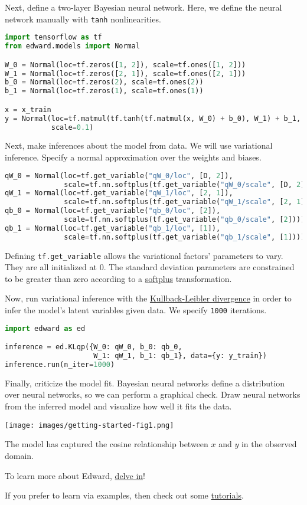 Next, define a two-layer Bayesian neural network. Here, we
define the neural network manually with \texttt{tanh} nonlinearities.

\begin{lstlisting}[language=Python]
import tensorflow as tf
from edward.models import Normal

W_0 = Normal(loc=tf.zeros([1, 2]), scale=tf.ones([1, 2]))
W_1 = Normal(loc=tf.zeros([2, 1]), scale=tf.ones([2, 1]))
b_0 = Normal(loc=tf.zeros(2), scale=tf.ones(2))
b_1 = Normal(loc=tf.zeros(1), scale=tf.ones(1))

x = x_train
y = Normal(loc=tf.matmul(tf.tanh(tf.matmul(x, W_0) + b_0), W_1) + b_1,
           scale=0.1)
\end{lstlisting}

Next, make inferences about the model from data. We will use variational
inference. Specify a normal approximation over the weights and biases.

\begin{lstlisting}[language=Python]
qW_0 = Normal(loc=tf.get_variable("qW_0/loc", [D, 2]),
              scale=tf.nn.softplus(tf.get_variable("qW_0/scale", [D, 2])))
qW_1 = Normal(loc=tf.get_variable("qW_1/loc", [2, 1]),
              scale=tf.nn.softplus(tf.get_variable("qW_1/scale", [2, 1])))
qb_0 = Normal(loc=tf.get_variable("qb_0/loc", [2]),
              scale=tf.nn.softplus(tf.get_variable("qb_0/scale", [2])))
qb_1 = Normal(loc=tf.get_variable("qb_1/loc", [1]),
              scale=tf.nn.softplus(tf.get_variable("qb_1/scale", [1])))
\end{lstlisting}

Defining \texttt{tf.get_variable} allows the variational factors'
parameters to vary. They are all initialized at 0. The standard
deviation parameters are constrained to be greater than zero according
to a
\href{https://en.wikipedia.org/wiki/Rectifier_(neural_networks)}{softplus}
transformation.

Now, run variational inference with the
\href{https://en.wikipedia.org/wiki/Kullback–Leibler_divergence}{Kullback-Leibler divergence}
in order to infer the model's latent variables given data.
We specify \texttt{1000} iterations.

\begin{lstlisting}[language=Python]
import edward as ed

inference = ed.KLqp({W_0: qW_0, b_0: qb_0,
                     W_1: qW_1, b_1: qb_1}, data={y: y_train})
inference.run(n_iter=1000)
\end{lstlisting}

Finally, criticize the model fit. Bayesian neural networks define a distribution
over neural networks, so we can perform a graphical check. Draw neural networks
from the inferred model and visualize how well it fits the data.

\texttt{[image: images/getting-started-fig1.png]}

The model has captured the cosine relationship between $x$ and $y$
in the observed domain.

To learn more about Edward, \href{/api}{delve in}!

If you prefer to learn via examples, then check out some
\href{/tutorials/}{tutorials}.
